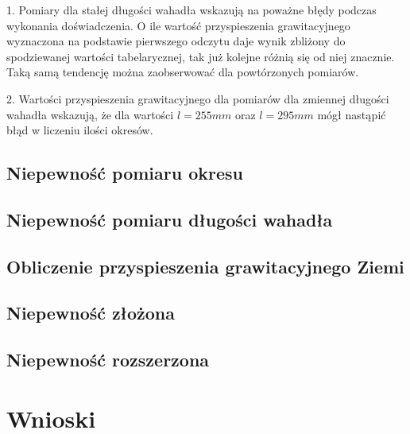 \documentclass[a4paper,10pt,twoside]{article}
\begin{document}
1. Pomiary dla stałej długości wahadła wskazują na poważne błędy podczas wykonania doświadczenia. O ile wartość przyspieszenia grawitacyjnego wyznaczona na podstawie pierwszego odczytu daje wynik zbliżony do spodziewanej wartości tabelarycznej, tak już kolejne różnią się od niej znacznie. Taką samą tendencję można zaobserwować dla powtórzonych pomiarów.

2. Wartości przyspieszenia grawitacyjnego dla pomiarów dla zmiennej długości wahadła wskazują, że dla wartości $l=255mm$ oraz $l=295mm$ mógł nastąpić błąd w liczeniu ilości okresów.

\subsection{Niepewność pomiaru okresu}
\subsection{Niepewność pomiaru długości wahadła}
\subsection{Obliczenie przyspieszenia grawitacyjnego Ziemi}
\subsection{Niepewność złożona}
\subsection{Niepewność rozszerzona}

\section{Wnioski}
\end{document}
